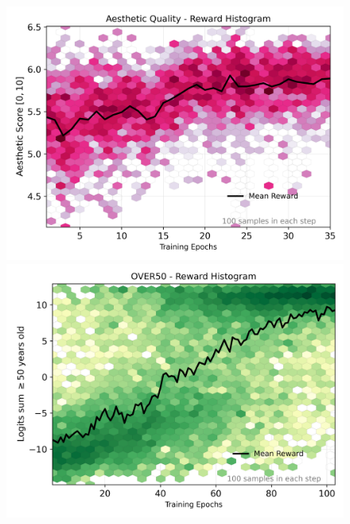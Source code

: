 \begin{figure}[ht]
  \centering
  \begin{minipage}{0.5\textwidth}
      \centering
      \includegraphics[width=1\textwidth]{img/results/reward_hist-laion-aesthetic.png} %
  \end{minipage}\hfill
  \begin{minipage}{0.5\textwidth}
      \centering
      \includegraphics[width=1\textwidth]{img/results/reward_hist-over50.png} %
  \end{minipage}\vspace{-0.1cm} %

\end{figure}
